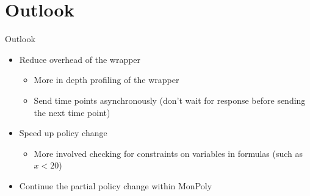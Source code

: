 \section{Outlook}
\begin{frame}{Outlook}
    \begin{itemize}
        \item Reduce overhead of the wrapper
        \begin{itemize}
            \item More in depth profiling of the wrapper
            \item Send time points asynchronously (don't wait for response before sending the next time point)
        \end{itemize}
        \item Speed up policy change
        \begin{itemize}
            \item More involved checking for constraints on variables in formulas (such as $x < 20$)
        \end{itemize}
        \item Continue the partial policy change within MonPoly
    \end{itemize}
    
\end{frame}